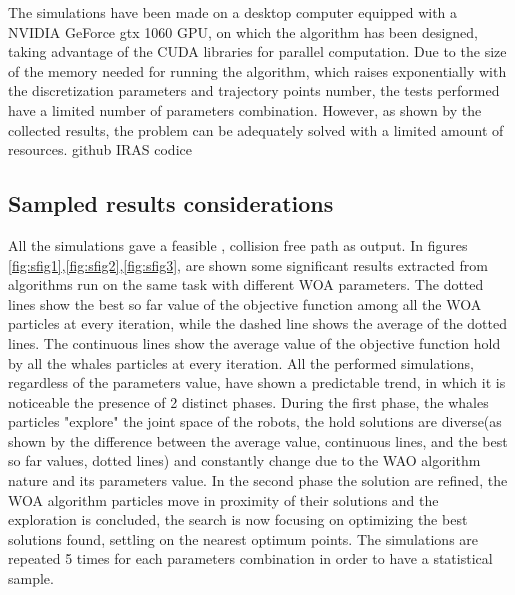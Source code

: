 \documentclass[twocolumn]{svjour3}
\newcommand{\rev}[1]{\textcolor{verde}{#1}}
\begin{document}
The simulations have been made on a desktop computer equipped with a NVIDIA GeForce gtx 1060 GPU, on which the algorithm has been designed, taking advantage of the CUDA libraries for parallel computation.
Due to the size of the memory needed for running the algorithm, which raises exponentially with the discretization parameters and trajectory points number, the tests performed have a limited number of parameters combination.
However, as shown by the collected results, the problem can be adequately solved with a limited amount of resources.  
\rev{github IRAS codice }



\subsection{Sampled results considerations}
All the simulations gave a feasible , collision free path as output.
In figures \ref{fig:sfig1},\ref{fig:sfig2},\ref{fig:sfig3}, are shown some significant results extracted from algorithms run on the same task with different WOA parameters.
The dotted lines show the best so far value of the objective function among all the WOA particles at every iteration, while the dashed line shows the average of the dotted lines.
The continuous lines show the average value of the objective function hold by all the whales particles at every iteration.
All the performed simulations, regardless of the parameters value, have shown a predictable trend, in which it is noticeable the presence of 2 distinct phases.
During the first phase, the whales particles "explore" the joint space of the robots, the hold solutions are diverse(as shown by the difference between the average value, continuous lines, and the best so far values, dotted lines) and constantly change due to the WAO algorithm nature and its parameters value.
In the second phase the solution are refined, the WOA algorithm particles move in proximity of their solutions and the exploration is concluded, the search is now focusing on optimizing the best solutions found, settling on the nearest optimum points.
The simulations are repeated 5 times for each parameters combination in order to have a statistical sample.
\end{document}
